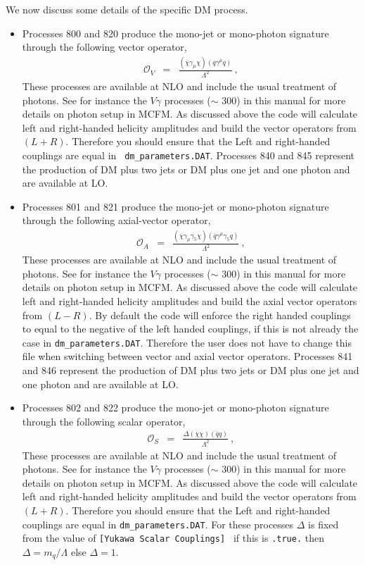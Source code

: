 We now discuss some details of the specific DM process.

\begin{itemize}
\item 
Processes 800 and 820 produce the 
mono-jet or mono-photon signature through the following vector operator, 
\begin{eqnarray}
\mathcal{O}_V&=&\frac{(\overline{\chi}\gamma_{\mu}\chi)(\overline{q}\gamma^{\mu}q)}{\Lambda^2}~,\label{eq:OV}  
\end{eqnarray}
These processes are available at NLO and include the usual treatment of photons. See for instance the $V\gamma$ 
processes ($\sim$ 300) in this 
manual for more details on photon setup in MCFM. As discussed above the code will calculate left and right-handed 
helicity amplitudes and build the 
vector operators from $(L+R)$. Therefore you should ensure that the Left and right-handed couplings are equal in  {\tt 
dm\_parameters.DAT}. 
Processes 840 and 845 represent the production of DM plus two jets or DM plus one jet and one photon and are available 
at LO. 
\item 
Processes 801 and 821 produce the 
mono-jet or mono-photon signature through the following axial-vector operator, 
\begin{eqnarray}
\mathcal{O}_A&=&\frac{(\overline{\chi}\gamma_{\mu}\gamma_5\chi)(\overline{q}\gamma^{\mu}\gamma_5q)}{\Lambda^2}~,\label{eq:OA}
\end{eqnarray}
These processes are available at NLO and include the usual treatment
of photons. See for instance the $V\gamma$ processes ($\sim$ 300) in
this manual for more details on photon setup in MCFM. As discussed
above the code will calculate left and right-handed helicity
amplitudes and build the axial vector operators from $(L-R)$. By
default the code will enforce the right handed couplings to equal to
the negative of the left handed couplings, if this is not
already the case in {\tt dm\_parameters.DAT}. Therefore the user does
not have to change this file when switching between vector and axial
vector operators.  Processes 841 and 846 represent the production of
DM plus two jets or DM plus one jet and one photon and are available
at LO.
\item 
Processes 802 and 822 produce the 
mono-jet or mono-photon signature through the following scalar operator, 
\begin{eqnarray}
\mathcal{O}_S&=&\frac{\Delta(\overline{\chi}\chi)(\overline{q}q)}{\Lambda^2}~,
\end{eqnarray}
These processes are available at NLO and include the usual treatment
of photons. See for instance the $V\gamma$ processes ($\sim$ 300) in
this manual for more details on photon setup in MCFM. As discussed
above the code will calculate left and right-handed helicity
amplitudes and build the vector operators from $(L+R)$. Therefore you
should ensure that the Left and right-handed couplings are equal in
{\tt dm\_parameters.DAT}. For these processes $\Delta$ is fixed from
the value of {\tt [Yukawa Scalar Couplings] } if this is {\tt .true.}
then $\Delta=m_q/\Lambda$ else $\Delta=1$.


\end{itemize}
